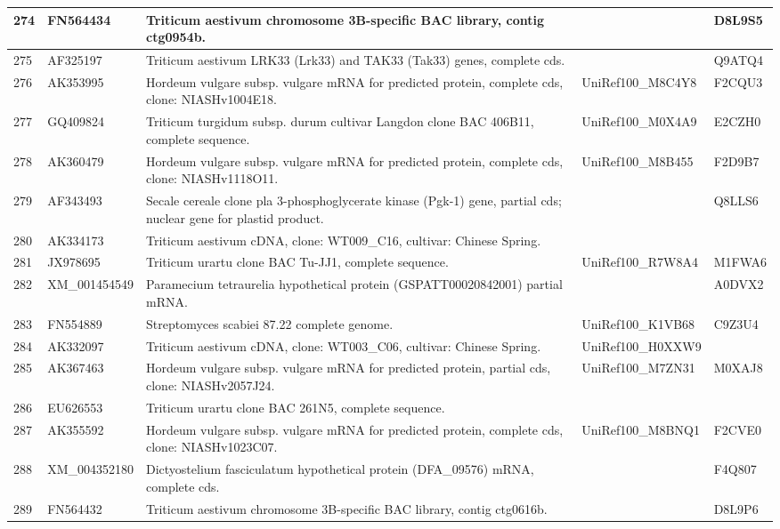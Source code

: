 \documentclass[10.9pt]{article} %
\begin{document}
{\begin{longtable}{|p{1.3cm}|p{1.8cm}|p{6.2cm}|p{3.8cm}|p{2cm}|}
\hline
274 & FN564434 & Triticum aestivum chromosome 3B-specific BAC library, contig ctg0954b. &  & D8L9S5\\
\hline
275 & AF325197 & Triticum aestivum LRK33 (Lrk33) and TAK33 (Tak33) genes, complete cds. &  & Q9ATQ4\\
\hline
276 & AK353995 & Hordeum vulgare subsp. vulgare mRNA for predicted protein, complete cds, clone: NIASHv1004E18. & UniRef100\_M8C4Y8 & F2CQU3\\
\hline
277 & GQ409824 & Triticum turgidum subsp. durum cultivar Langdon clone BAC 406B11, complete sequence. & UniRef100\_M0X4A9 & E2CZH0\\
\hline
278 & AK360479 & Hordeum vulgare subsp. vulgare mRNA for predicted protein, complete cds, clone: NIASHv1118O11. & UniRef100\_M8B455 & F2D9B7\\
\hline
279 & AF343493 & Secale cereale clone pla 3-phosphoglycerate kinase (Pgk-1) gene, partial cds; nuclear gene for plastid product. &  & Q8LLS6\\
\hline
280 & AK334173 & Triticum aestivum cDNA, clone: WT009\_C16, cultivar: Chinese Spring. &  & \\
\hline
281 & JX978695 & Triticum urartu clone BAC Tu-JJ1, complete sequence. & UniRef100\_R7W8A4 & M1FWA6\\
\hline
282 & XM\_001454549 & Paramecium tetraurelia hypothetical protein (GSPATT00020842001) partial mRNA. &  & A0DVX2\\
\hline
283 & FN554889 & Streptomyces scabiei 87.22 complete genome. & UniRef100\_K1VB68 & C9Z3U4\\
\hline
284 & AK332097 & Triticum aestivum cDNA, clone: WT003\_C06, cultivar: Chinese Spring. & UniRef100\_H0XXW9 & \\
\hline
285 & AK367463 & Hordeum vulgare subsp. vulgare mRNA for predicted protein, partial cds, clone: NIASHv2057J24. & UniRef100\_M7ZN31 & M0XAJ8\\
\hline
286 & EU626553 & Triticum urartu clone BAC 261N5, complete sequence. &  & \\
\hline
287 & AK355592 & Hordeum vulgare subsp. vulgare mRNA for predicted protein, complete cds, clone: NIASHv1023C07. & UniRef100\_M8BNQ1 & F2CVE0\\
\hline
288 & XM\_004352180 & Dictyostelium fasciculatum hypothetical protein (DFA\_09576) mRNA, complete cds. &  & F4Q807\\
\hline
289 & FN564432 & Triticum aestivum chromosome 3B-specific BAC library, contig ctg0616b. &  & D8L9P6\\

\end{longtable}}
\end{document}
